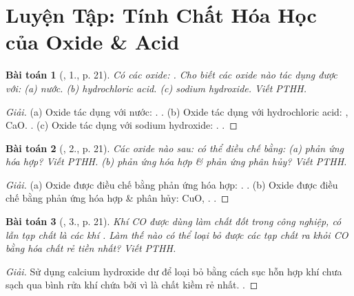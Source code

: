 \documentclass{article}
\newtheorem{baitoan}{Bài toán}
\begin{document}
\section{Luyện Tập: Tính Chất Hóa Học của Oxide \& Acid}

\begin{baitoan}[\cite{SGK_Hoa_Hoc_9}, 1., p. 21]
	Có các oxide: {\rm{}}. Cho biết các oxide nào tác dụng được với: (a) nước. (b) hydrochloric acid. (c) sodium hydroxide. Viết {\rm PTHH}.
\end{baitoan}

\begin{proof}[Giải]
	(a) Oxide tác dụng với nước: . . (b) Oxide tác dụng với hydrochloric acid: , CaO. . (c) Oxide tác dụng với sodium hydroxide: . .
\end{proof}

\begin{baitoan}[\cite{SGK_Hoa_Hoc_9}, 2., p. 21]
	Các oxide nào sau: {\rm{}} có thể điều chế bằng: (a) phản ứng hóa hợp? Viết PTHH. (b) phản ứng hóa hợp \& phản ứng phân hủy? Viết PTHH.
\end{baitoan}

\begin{proof}[Giải]
	(a) Oxide được điều chế bằng phản ứng hóa hợp: . . (b) Oxide được điều chế bằng phản ứng hóa hợp \& phân hủy: CuO, . .
\end{proof}

\begin{baitoan}[\cite{SGK_Hoa_Hoc_9}, 3., p. 21]
	Khí {\rm CO} được dùng làm chất đốt trong công nghiệp, có lẫn tạp chất là các khí {\rm{}}. Làm thế nào có thể loại bỏ được các tạp chất ra khỏi {\rm CO} bằng hóa chất rẻ tiền nhất? Viết {\rm PTHH}.
\end{baitoan}

\begin{proof}[Giải]
	 Sử dụng calcium hydroxide dư để loại bỏ  bằng cách sục hỗn hợp khí chưa sạch qua bình rửa khí chứa  bởi vì  là chất kiềm rẻ nhất. .
\end{proof}
\end{document}
